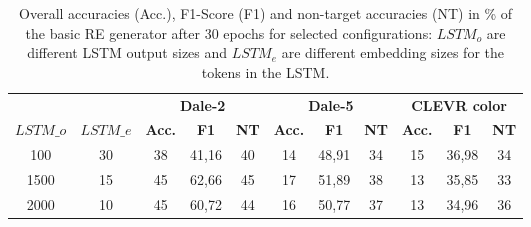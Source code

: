 \begin{table}[ht]
    \centering
    \begin{tabular}{cc|ccc|ccc|ccc}
        \toprule
                  &           & \multicolumn{3}{c}{\textbf{Dale-2}} & \multicolumn{3}{c}{\textbf{Dale-5}} & \multicolumn{3}{c}{\textbf{CLEVR color}}                                                                                         \\  \cmidrule(lr){3-5}\cmidrule(lr){6-8}\cmidrule(lr){9-11}
        $LSTM\_o$ & $LSTM\_e$ & \textbf{Acc.}                       & \textbf{F1}                         & \textbf{NT}                              & \textbf{Acc.} & \textbf{F1} & \textbf{NT} & \textbf{Acc.} & \textbf{F1} & \textbf{NT} \\\midrule
        {100}     & {30}      & {38}                                & {41,16}                             & {40}                                     & {14}          & {48,91}     & {34}        & {15}          & {36,98}     & {34}        \\
        {1500}    & {15}      & {45}                                & {62,66}                             & {45}                                     & {17}          & {51,89}     & {38}        & {13}          & {35,85}     & {33}        \\
        {2000}    & {10}      & {45}                                & {60,72}                             & {44}                                     & {16}          & {50,77}     & {37}        & {13}          & {34,96}     & {36}        \\
        \bottomrule
    \end{tabular}
    \caption{Overall accuracies (Acc.), F1-Score (F1) and non-target accuracies (NT) in \% of the basic RE generator after 30 epochs for selected configurations: $LSTM_o$ are different LSTM output sizes and $LSTM_e$ are different embedding sizes for the tokens in the LSTM.}
    \label{tab:results:basic-re-generator}
\end{table}

